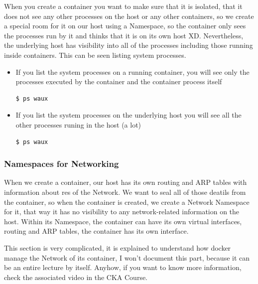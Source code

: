 \documentclass{article}
\newenvironment{codetemplate}[1][]{%
  \mybasecolorbox[#1]
  \itshape
}{%
  \endmybasecolorbox
}
\begin{document}
When you create a container you want to make sure that it is isolated, that it does not see any other processes on the host or any other containers, so we create a special room for it on our host using a Namespace, so the container only sees the processes run by it and thinks that it is on its own host XD. Nevertheless, the underlying host has visibility into all of the processes including those running inside containers. This can be seen listing system processes.

\begin{itemize}
    \item If you list the system processes on a running container, you will see only the processes executed by the container and the container process itself
\begin{codetemplate}{}
\begin{verbatim}
$ ps waux
\end{verbatim}
\end{codetemplate}

    \item If you list the system processes on the underlying host you will see all the other processes runing in the host (a lot)
\begin{codetemplate}{}
\begin{verbatim}
$ ps waux
\end{verbatim}
\end{codetemplate}
\end{itemize}

\subsubsection{Namespaces for Networking}

When we create a container, our host has its own routing and ARP tables with information about res of the Network. We want to seal all of those deatils from the container, so when the container is created, we create a Network Namespace for it, that way it has no visibility to any network-related information on the host. Within its Namespace, the container can have its own virtual interfaces, routing and ARP tables, the container has its own interface.

This section is very complicated, it is explained to understand how docker manage the Network of its container, I won't document this part, because it can be an entire lecture by itself. Anyhow, if you want to know more information, check the associated video in the CKA Course.
\end{document}
